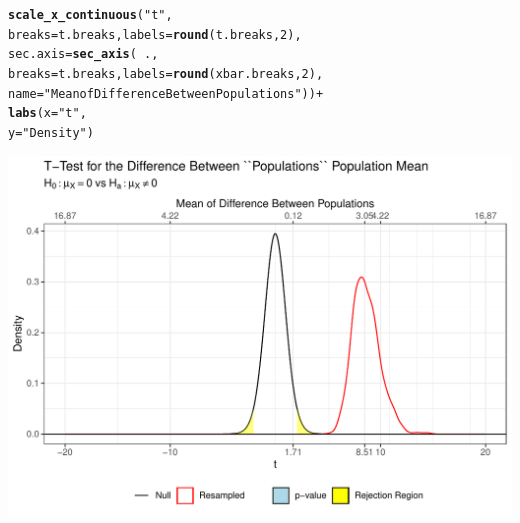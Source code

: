 \documentclass{article}\usepackage[]{graphicx}\usepackage[]{xcolor}
\makeatletter
\def\maxwidth{ %
  \ifdim\Gin@nat@width>\linewidth
    \linewidth
  \else
    \Gin@nat@width
  \fi
}
\newcommand{\hlnum}[1]{\textcolor[rgb]{0.686,0.059,0.569}{#1}}%
\newcommand{\hlsng}[1]{\textcolor[rgb]{0.192,0.494,0.8}{#1}}%
\newcommand{\hlopt}[1]{\textcolor[rgb]{0,0,0}{#1}}%
\newcommand{\hldef}[1]{\textcolor[rgb]{0.345,0.345,0.345}{#1}}%
\newcommand{\hlkwc}[1]{\textcolor[rgb]{0.333,0.667,0.333}{#1}}%
\newcommand{\hlkwd}[1]{\textcolor[rgb]{0.737,0.353,0.396}{\textbf{#1}}}%
\newenvironment{kframe}{%
 \def\at@end@of@kframe{}%
 \ifinner\ifhmode%
  \def\at@end@of@kframe{\end{minipage}}%
  \begin{minipage}{\columnwidth}%
 \fi\fi%
 \def\FrameCommand##1{\hskip\@totalleftmargin \hskip-\fboxsep
 \colorbox{shadecolor}{##1}\hskip-\fboxsep
     \hskip-\linewidth \hskip-\@totalleftmargin \hskip\columnwidth}%
 \MakeFramed {\advance\hsize-\width
   \@totalleftmargin\z@ \linewidth\hsize
   \@setminipage}}%
 {\par\unskip\endMakeFramed%
 \at@end@of@kframe}
\newenvironment{knitrout}{}{} %
\makeatother
\begin{document}
\begin{enumerate}
\begin{enumerate}
\begin{knitrout}
\begin{kframe}
\begin{alltt}
  \hlkwd{scale_x_continuous}\hldef{(}\hlsng{"t"}\hldef{,}
                     \hlkwc{breaks} \hldef{= t.breaks,} \hlkwc{labels} \hldef{=} \hlkwd{round}\hldef{(t.breaks,} \hlnum{2}\hldef{),}
                     \hlkwc{sec.axis} \hldef{=} \hlkwd{sec_axis}\hldef{(}\hlopt{~} \hldef{.,}
                                         \hlkwc{breaks} \hldef{= t.breaks,} \hlkwc{labels} \hldef{=} \hlkwd{round}\hldef{(xbar.breaks,} \hlnum{2}\hldef{),}
                                         \hlkwc{name} \hldef{=} \hlsng{"Mean of Difference Between Populations"}\hldef{))} \hlopt{+}
  \hlkwd{labs}\hldef{(}\hlkwc{x} \hldef{=} \hlsng{"t"}\hldef{,}
       \hlkwc{y} \hldef{=} \hlsng{"Density"}\hldef{)}
\end{alltt}
\end{kframe}
\includegraphics[width=\maxwidth]{figure/unnamed-chunk-12-1} 
\end{knitrout}
  
\end{enumerate}
\end{enumerate}



\end{document}
